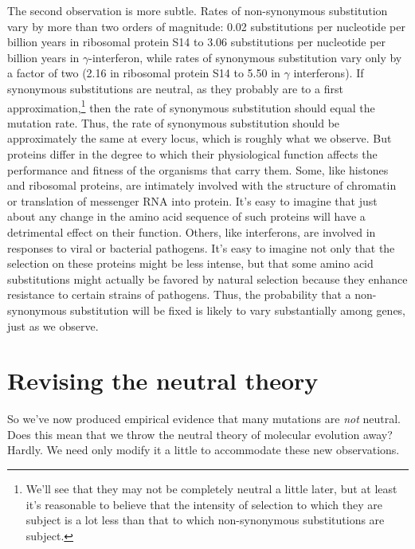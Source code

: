 \documentclass[12pt]{article}
\begin{document}
The second observation is more subtle. Rates of non-synonymous
substitution vary by more than two orders of magnitude: 0.02
substitutions per nucleotide per billion years in ribosomal protein
S14 to 3.06 substitutions per nucleotide per billion years in
$\gamma$-interferon, while rates of synonymous substitution vary only
by a factor of two (2.16 in ribosomal protein S14 to 5.50 in $\gamma$
interferons). If synonymous substitutions are neutral, as they
probably are to a first approximation,\footnote{We'll see that they
  may not be completely neutral a little later, but at least it's
  reasonable to believe that the intensity of selection to which they
  are subject is a lot less than that to which non-synonymous
  substitutions are subject.}  then the rate of synonymous
substitution should equal the mutation rate. Thus, the rate of
synonymous substitution should be approximately the same at every
locus, which is roughly what we observe. But proteins differ in the
degree to which their physiological function affects the performance
and fitness of the organisms that carry them. Some, like histones and
ribosomal proteins, are intimately involved with the structure of
chromatin or translation of messenger RNA into protein. It's easy to
imagine that just about any change in the amino acid sequence of such
proteins will have a detrimental effect on their function. Others,
like interferons, are involved in responses to viral or bacterial
pathogens. It's easy to imagine not only that the selection on these
proteins might be less intense, but that some amino acid substitutions
might actually be favored by natural selection because they enhance
resistance to certain strains of pathogens. Thus, the probability that
a non-synonymous substitution will be fixed is likely to vary
substantially among genes, just as we observe.

\section*{Revising the neutral theory}

So we've now produced empirical evidence that many mutations are {\it
  not\/} neutral. Does this mean that we throw the neutral theory of
molecular evolution away? Hardly. We need only modify it a little to
accommodate these new observations.
\end{document}
